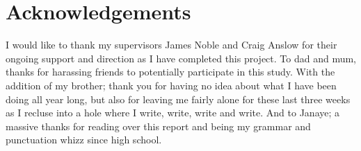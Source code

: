 \chapter*{Acknowledgements}\label{C:Acknowledge}

I would like to thank my supervisors James Noble and Craig Anslow for their ongoing support and direction as I have completed this project.
\newline
\newline
To dad and mum, thanks for harassing friends to potentially participate in this study. With the addition of my brother;  thank you for having no idea about what I have been doing all year long, but also for leaving me fairly alone for these last three weeks as I recluse into a hole where I write, write, write and write. 
\newline
\newline
And to Janaye; a massive thanks for reading over this report and being my grammar and punctuation whizz since high school. 